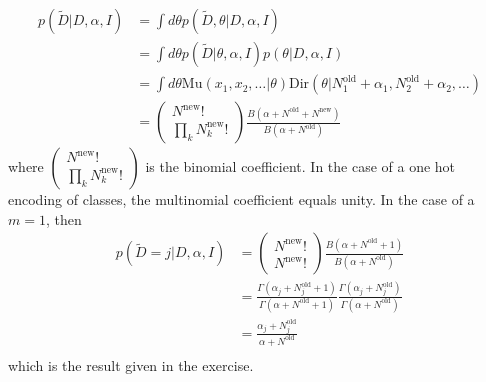 \begin{example}
	\begin{equation}
		\begin{split}
			p(\tilde{D}|D,\alpha,I) & = \int d\theta p(\tilde{D},\theta|D,\alpha,I) \\ 
			& = \int d\theta p(\tilde{D}|\theta,\alpha,I)p(\theta|D,\alpha,I) \\
			&=\int d\theta \text{Mu}(x_1,x_2,\dots |\theta)\text{Dir}(\theta|N_1^{\text{old}}+\alpha_1,N_2^{\text{old}}+\alpha_2,\dots)\\
			&= \begin{pmatrix}
				N^{\text{new}}!\\
				\prod_k N_k^{\text{new}}!
			\end{pmatrix}\frac{B(\alpha+N^{\text{old}}+N^{\text{new}})}{B(\alpha+N^{\text{old}})}
		\end{split}
	\end{equation}
	where $\begin{pmatrix}
		N^{\text{new}}!\\
		\prod_k N_k^{\text{new}}!
	\end{pmatrix}$ is the binomial coefficient.	In the case of a one hot encoding of classes, the multinomial coefficient equals unity. In the case of a $m=1$, then
	\begin{equation}
		\begin{split}
			p(\tilde{D}=j|D,\alpha,I) &= \begin{pmatrix}
				N^{\text{new}}!\\
				N^{\text{new}}!
			\end{pmatrix}\frac{B(\alpha+N^{\text{old}}+1)}{B(\alpha+N^{\text{old}})}\\
			&=\frac{\Gamma(\alpha_j+N^{\text{old}}_j+1)}{\Gamma(\alpha+N^{\text{old}}+1)}\frac{\Gamma(\alpha_j+N^{\text{old}}_j)}{\Gamma(\alpha+N^{\text{old}})}\\
			&=\frac{\alpha_j+N^{\text{old}}_j}{\alpha+N^{\text{old}}}\\
		\end{split}
	\end{equation}
	which is the result given in the exercise.
	
\end{example}

